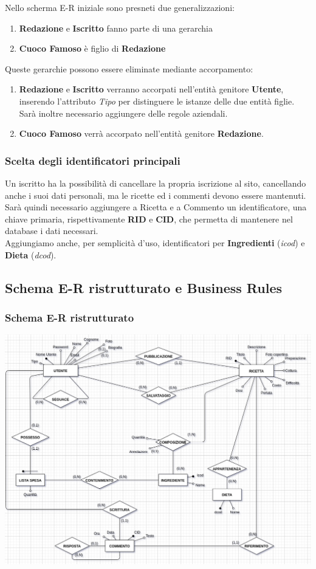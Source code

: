 \documentclass[12pt]{extarticle}
\begin{document}
Nello scherma E-R iniziale sono presneti due generalizzazioni:
\begin{enumerate}
    \item \textbf{Redazione} e \textbf{Iscritto} fanno parte di una gerarchia
    \item \textbf{Cuoco Famoso} è figlio di \textbf{Redazione}
\end{enumerate}

Queste gerarchie possono essere eliminate mediante accorpamento:
\begin{enumerate}
    \item \textbf{Redazione} e \textbf{Iscritto} verranno accorpati nell'entità genitore \textbf{Utente}, inserendo l'attributo \textit{Tipo} per distinguere le istanze delle due entità figlie. Sarà inoltre necessario aggiungere delle regole aziendali.
    \item \textbf{Cuoco Famoso} verrà accorpato nell'entità genitore \textbf{Redazione}.
\end{enumerate}

\subsubsection{Scelta degli identificatori principali}

Un iscritto ha la possibilità di cancellare la propria iscrizione al sito, 
cancellando anche i  suoi dati personali, ma le ricette ed i commenti devono essere mantenuti.
Sarà quindi necessario aggiungere a Ricetta e a Commento un identificatore, una chiave primaria,
rispettivamente \textbf{RID} e \textbf{CID}, che permetta di mantenere nel database i dati necessari.
\\
Aggiungiamo anche, per semplicità d'uso, identificatori per \textbf{Ingredienti} (\textit{icod}) e \textbf{Dieta} (\textit{dcod}).

\subsection{Schema E-R ristrutturato e Business Rules}

\subsubsection{Schema E-R ristrutturato}
\includegraphics[width=\textwidth]{er2.png}
\end{document}
